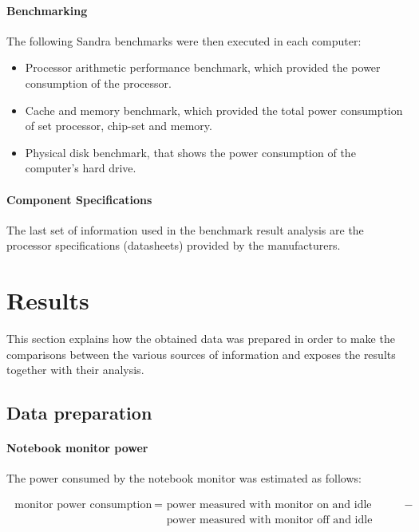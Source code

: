             
        \paragraph*{Benchmarking}
            The following Sandra benchmarks were then executed in each computer:
            \begin{itemize}
                \item Processor arithmetic performance benchmark, which provided the power consumption of the processor.
                \item Cache and memory benchmark, which provided the total power consumption of set processor, chip-set and memory.
                \item Physical disk benchmark, that shows the power consumption of the computer's hard drive.
            \end{itemize}
            
            
        \paragraph*{Component Specifications}
            The last set of information used in the benchmark result analysis are the processor specifications (datasheets) provided by the manufacturers.      
                        
            
\section{Results} \label{sec4:results}
This section explains how the obtained data was prepared in order to make the comparisons between the various sources of information and exposes the results together with their analysis.

    \subsection{Data preparation} \label{sec4:data_preparation}

        \paragraph*{Notebook monitor power}
        
            The power consumed by the notebook monitor was estimated as follows: 
            
            \begin{equation}
                \begin{split}
                    \text{ monitor power consumption } =& \text{ power measured with monitor on and idle processor } -  \\
                    & \text{ power measured with monitor off and idle processor }  
                \end{split}
                \label{eq:monitor_consumption}
            \end{equation}
            
